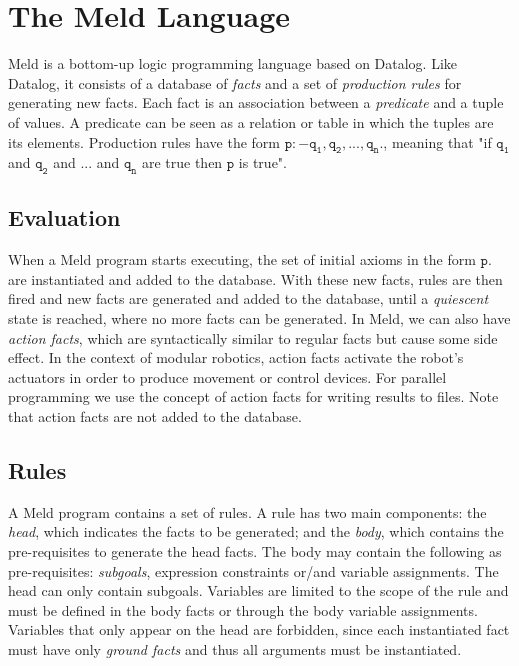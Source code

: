 \documentclass[preprint]{sigplanconf}
\begin{document}
\section{The Meld Language}

Meld is a bottom-up logic programming language based on Datalog. Like Datalog, it
consists of a database of \emph{facts} and a set of \emph{production rules} for generating new facts.
Each fact is an association between a \emph{predicate} and a tuple of values. A predicate can be seen
as a relation or table in which the tuples are its elements. Production rules have the form
$\mathtt{p :- q_1, q_2, ..., q_n.}$, meaning that "if $\mathtt{q_1}$ and $\mathtt{q_2}$ and ... and
$\mathtt{q_n}$ are true then $\mathtt{p}$ is true".

\subsection{Evaluation}

When a Meld program starts executing, the set of initial axioms in the form $\mathtt{p.}$ are
instantiated and added to the database. With these new facts, rules are then fired and new
facts are generated and added to the database, until a \emph{quiescent} state is reached, where
no more facts can be generated. In Meld, we can also have \emph{action facts},
which are syntactically similar to regular facts but cause some side effect. In the context of
modular robotics, action facts activate the robot's actuators in order to produce movement
or control devices. For parallel programming we use the concept of action facts for writing
results to files. Note that action facts are not added to the database.

\subsection{Rules}

A Meld program contains a set of rules. A rule has two main components: the \emph{head},
which indicates the facts to be generated; and the \emph{body}, which contains the pre-requisites
to generate the head facts. The body may contain the following as pre-requisites: \emph{subgoals},
expression constraints or/and variable assignments. The head can only contain subgoals.
Variables are limited to the scope of the rule and must be defined in the body facts or through
the body variable assignments. Variables that only appear on the head are forbidden, since each
instantiated fact must have only \emph{ground facts} and thus all arguments must be instantiated.
\end{document}
